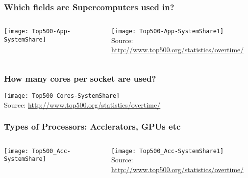 \documentclass[slidestop,mathserif,compress,xcolor=svgnames,table]{beamer}
\begin{document}
\begin{frame}
  \frametitle{\small Which fields are Supercomputers used in?}
  \begin{columns}
    \vspace{-0.5cm}
    \begin{center}
      \texttt{[image: Top500-App-SystemShare]}
    \end{center}
    \vspace{0.5cm}
    \begin{center}
      \hspace{-0.84cm}
      \texttt{[image: Top500-App-SystemShare1]}\\
      {\tiny Source: \url{http://www.top500.org/statistics/overtime/}}
    \end{center}
  \end{columns}
\end{frame}


\begin{frame}
  \frametitle{\small How many cores per socket are used?}
  \vspace{-0.5cm}
  \begin{center}
    \texttt{[image: Top500\_Cores-SystemShare]}\\
    {\tiny Source: \url{http://www.top500.org/statistics/overtime/}}
  \end{center}
\end{frame}

\begin{frame}
  \frametitle{\small Types of Processors: Acclerators, GPUs etc}
  \begin{columns}
    \vspace{-0.5cm}
    \begin{center}
      \texttt{[image: Top500\_Acc-SystemShare]}
    \end{center}
    \vspace{0.5cm}
    \begin{center}
      \hspace{-1cm}
      \texttt{[image: Top500\_Acc-SystemShare1]}\\
      {\tiny Source: \url{http://www.top500.org/statistics/overtime/}}
    \end{center}
  \end{columns}
\end{frame}
\end{document}
